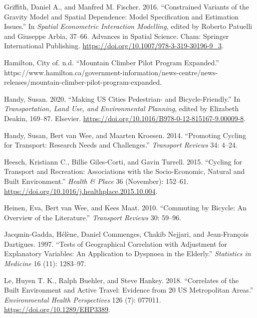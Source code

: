 \documentclass[smallextended]{svjour3}       %
\begin{document}
\leavevmode\hypertarget{ref-griffithConstrainedVariantsGravity2016}{}%
Griffith, Daniel A., and Manfred M. Fischer. 2016. ``Constrained
Variants of the Gravity Model and Spatial Dependence: Model
Specification and Estimation Issues.'' In \emph{Spatial Econometric
Interaction Modelling}, edited by Roberto Patuelli and Giuseppe Arbia,
37--66. Advances in Spatial Science. Cham: Springer International
Publishing. \url{https://doi.org/10.1007/978-3-319-30196-9_3}.

\leavevmode\hypertarget{ref-Hamilton2019}{}%
Hamilton, City of. n.d. ``Mountain Climber Pilot Program Expanded.''
https://www.hamilton.ca/government-information/news-centre/news-releases/mountain-climber-pilot-program-expanded.

\leavevmode\hypertarget{ref-handyMakingUSCities2020}{}%
Handy, Susan. 2020. ``Making US Cities Pedestrian- and
Bicycle-Friendly.'' In \emph{Transportation, Land Use, and Environmental
Planning}, edited by Elizabeth Deakin, 169--87. Elsevier.
\url{https://doi.org/10.1016/B978-0-12-815167-9.00009-8}.

\leavevmode\hypertarget{ref-handyPromotingCyclingTransport2014}{}%
Handy, Susan, Bert van Wee, and Maarten Kroesen. 2014. ``Promoting
Cycling for Transport: Research Needs and Challenges.'' \emph{Transport
Reviews} 34: 4--24.

\leavevmode\hypertarget{ref-Heesch2015}{}%
Heesch, Kristiann C., Billie Giles-Corti, and Gavin Turrell. 2015.
``Cycling for Transport and Recreation: Associations with the
Socio-Economic, Natural and Built Environment.'' \emph{Health \& Place}
36 (November): 152--61.
\url{https://doi.org/10.1016/j.healthplace.2015.10.004}.

\leavevmode\hypertarget{ref-heinenCommutingBicycleOverview2010}{}%
Heinen, Eva, Bert van Wee, and Kees Maat. 2010. ``Commuting by Bicycle:
An Overview of the Literature.'' \emph{Transport Reviews} 30: 59--96.

\leavevmode\hypertarget{ref-Jacqmin1997}{}%
Jacqmin-Gadda, Hélène, Daniel Commenges, Chakib Nejjari, and
Jean-François Dartigues. 1997. ``Tests of Geographical Correlation with
Adjustment for Explanatory Variables: An Application to Dyspnoea in the
Elderly.'' \emph{Statistics in Medicine} 16 (11): 1283--97.

\leavevmode\hypertarget{ref-Le2018}{}%
Le, Huyen T. K., Ralph Buehler, and Steve Hankey. 2018. ``Correlates of
the Built Environment and Active Travel: Evidence from 20 US
Metropolitan Areas.'' \emph{Environmental Health Perspectives} 126 (7):
077011. \url{https://doi.org/10.1289/EHP3389}.
\end{document}
